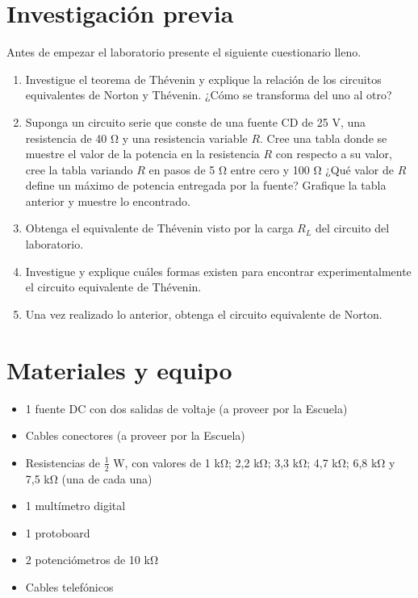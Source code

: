 \documentclass{report}
\newcommand{\inv}{Investigación previa}
\newcommand{\mat}{Materiales y equipo}
\newcommand{\antesde}{Antes de empezar el laboratorio presente el siguiente cuestionario lleno.}
\begin{document}
\section{\inv}
\antesde
\begin{enumerate}
\item Investigue el teorema de Thévenin y explique la relación de los circuitos
equivalentes de Norton y Thévenin. ¿Cómo se transforma del uno al otro?
\item Suponga un circuito serie que conste de una fuente CD de 25 V, una
resistencia de 40 \si{\ohm} y una resistencia variable $R$. Cree una tabla donde se
muestre el valor de la potencia en la resistencia $R$ con respecto a su valor,
cree la tabla variando $R$ en pasos de 5 \si{\ohm} entre cero y 100 \si{\ohm} ¿Qué valor de $R$ define un máximo de potencia entregada por la fuente? Grafique la tabla
anterior y muestre lo encontrado.
\item Obtenga el equivalente de Thévenin visto por la carga $R_L$ del circuito del
laboratorio.
\item Investigue y explique cuáles formas existen para encontrar experimentalmente el circuito equivalente de Thévenin.
\item Una vez realizado lo anterior, obtenga el circuito equivalente de Norton.
\end{enumerate}

\section{\mat}
\begin{itemize}
\item 1 fuente DC con dos salidas de voltaje (a proveer por la Escuela)
\item Cables conectores (a proveer por la Escuela)
\item Resistencias de $\frac{1}{2}$ \si{\watt}, con valores de 1 \si{\kilo\ohm}; 2,2 \si{\kilo\ohm}; 3,3 \si{\kilo\ohm}; 4,7 \si{\kilo\ohm}; 6,8 \si{\kilo\ohm} y
7,5 \si{\kilo\ohm} (una de cada una)
\item 1 multímetro digital
\item 1 protoboard
\item 2 potenciómetros de 10 \si{\kilo\ohm}
\item Cables telefónicos
\end{itemize}
\end{document}
